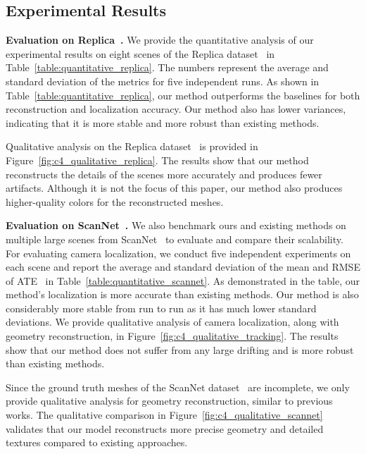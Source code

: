 \subsection{Experimental Results}
\noindent\textbf{Evaluation on Replica~\citep{replica19arxiv}.} We provide the quantitative analysis of our experimental results on eight scenes of the Replica dataset~\citep{replica19arxiv} in Table~\ref{table:quantitative_replica}. The numbers represent the average and standard deviation of the metrics for five independent runs. As shown in Table~\ref{table:quantitative_replica}, our method outperforms the baselines for both reconstruction and localization accuracy. Our method also has lower variances, indicating that it is more stable and more robust than existing methods.

Qualitative analysis on the Replica dataset~\citep{replica19arxiv} is provided in Figure~\ref{fig:c4_qualitative_replica}. The results show that our method reconstructs the details of the scenes more accurately and produces fewer artifacts. Although it is not the focus of this paper, our method also produces higher-quality colors for the reconstructed meshes.

\vspace{1ex}
\noindent\textbf{Evaluation on ScanNet~\citep{dai2017scannet}.} We also benchmark ours and existing methods on multiple large scenes from ScanNet~\citep{dai2017scannet} to evaluate and compare their scalability. For evaluating camera localization, we conduct five independent experiments on each scene and report the average and standard deviation of the mean and RMSE of ATE~\citep{sturm2012benchmark} in Table~\ref{table:quantitative_scannet}. As demonstrated in the table, our method's localization is more accurate than existing methods. Our method is also considerably more stable from run to run as it has much lower standard deviations. We provide qualitative analysis of camera localization, along with geometry reconstruction, in Figure~\ref{fig:c4_qualitative_tracking}. The results show that our method does not suffer from any large drifting and is more robust than existing methods.

Since the ground truth meshes of the ScanNet dataset~\citep{dai2017scannet} are incomplete, we only provide qualitative analysis for geometry reconstruction, similar to previous works. The qualitative comparison in Figure~\ref{fig:c4_qualitative_scannet} validates that our model reconstructs more precise geometry and detailed textures compared to existing approaches.

